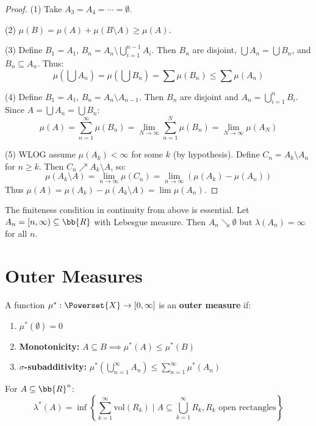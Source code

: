\begin{proof}
(1) Take $A_3 = A_4 = \cdots = \emptyset$.

(2) $\mu(B) = \mu(A) + \mu(B \setminus A) \geq \mu(A)$.

(3) Define $B_1 = A_1$, $B_n = A_n \setminus \bigcup_{i=1}^{n-1} A_i$. Then $B_n$ are disjoint, $\bigcup A_n = \bigcup B_n$, and $B_n \subseteq A_n$. Thus:
\[ \mu\left(\bigcup A_n\right) = \mu\left(\bigcup B_n\right) = \sum \mu(B_n) \leq \sum \mu(A_n) \]

(4) Define $B_1 = A_1$, $B_n = A_n \setminus A_{n-1}$. Then $B_n$ are disjoint and $A_n = \bigcup_{i=1}^n B_i$. Since $A = \bigcup A_n = \bigcup B_n$:
\[ \mu(A) = \sum_{n=1}^\infty \mu(B_n) = \lim_{N \to \infty} \sum_{n=1}^N \mu(B_n) = \lim_{N \to \infty} \mu(A_N) \]

(5) WLOG assume $\mu(A_k) < \infty$ for some $k$ (by hypothesis). Define $C_n = A_k \setminus A_n$ for $n \geq k$. Then $C_n \nearrow A_k \setminus A$, so:
\[ \mu(A_k \setminus A) = \lim_{n \to \infty} \mu(C_n) = \lim_{n \to \infty} (\mu(A_k) - \mu(A_n)) \]
Thus $\mu(A) = \mu(A_k) - \mu(A_k \setminus A) = \lim \mu(A_n)$.
\end{proof}

\begin{example}
The finiteness condition in continuity from above is essential. Let $A_n = [n, \infty) \subseteq \bb{R}$ with Lebesgue measure. Then $A_n \searrow \emptyset$ but $\lambda(A_n) = \infty$ for all $n$.
\end{example}

\section{Outer Measures}

\begin{definition}
A function $\mu^*: \Powerset{X} \to [0, \infty]$ is an \textbf{outer measure} if:
\begin{enumerate}
    \item $\mu^*(\emptyset) = 0$
    \item \textbf{Monotonicity:} $A \subseteq B \implies \mu^*(A) \leq \mu^*(B)$
    \item \textbf{$\sigma$-subadditivity:} $\mu^*(\bigcup_{n=1}^\infty A_n) \leq \sum_{n=1}^\infty \mu^*(A_n)$
\end{enumerate}
\end{definition}

\begin{definition}
For $A \subseteq \bb{R}^n$:
\[ \lambda^*(A) = \inf \left\{ \sum_{k=1}^\infty \text{vol}(R_k) \mid A \subseteq \bigcup_{k=1}^\infty R_k, R_k \text{ open rectangles} \right\} \]
\end{definition}

